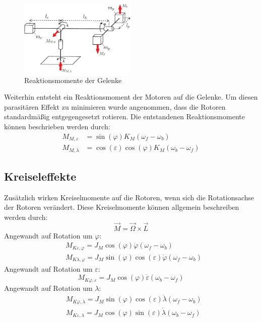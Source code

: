 \documentclass[times, 9pt,twocolumn]{article}
\begin{document}
	\begin{figure}[ht]
	\centering
	\includegraphics[width=0.5\textwidth]{images/setup_mom}
	\caption{Reaktionsmomente der Gelenke}
	\label{setup_mom}
	\end{figure}
	Weiterhin entsteht ein Reaktionsmoment der Motoren auf die Gelenke. Um diesen parasitären Effekt zu minimieren wurde angenommen, dass die Rotoren standardmäßig entgegengesetzt rotieren. Die entstandenen Reaktionsmomente können beschrieben werden durch:
	\begin{align}
	M_{M,\varepsilon} &=\sin (\varphi) K_M (\omega_f-\omega_b) \\
	M_{M,\lambda} &=\cos (\varepsilon) \cos (\varphi) K_M (\omega_b-\omega_f)
	\end{align}

	\subsection{Kreiseleffekte}

	Zusätzlich wirken Kreiselmomente auf die Rotoren, wenn sich die Rotationsachse der Rotoren verändert. Diese Kreiselmomente können allgemein beschreiben werden durch:
	\begin{equation}
	\vec{M} = \vec{\Omega} \times \vec{L}
	\end{equation}	
	Angewandt auf Rotation um $\varphi$:
	\begin{align}
	&M_{K\varepsilon,\varphi} = J_M \cos (\varphi) \dot{\varphi}(\omega_f-\omega_b)\\
	&M_{K\lambda,\varphi} = J_M \sin (\varphi) \cos (\varepsilon) \dot{\varphi}(\omega_f-\omega_b)
	\end{align}
	Angewandt auf Rotation um $\varepsilon$:
	\begin{equation}
	M_{K\varphi,\varepsilon} = J_M \cos (\varphi) \dot{\varepsilon}(\omega_b-\omega_f)
	\end{equation}
	Angewandt auf Rotation um $\lambda$:
	\begin{align}
	&M_{K\varphi,\lambda} = J_M \sin (\varphi) \cos (\varepsilon) \dot{\lambda}(\omega_f-\omega_b)\\
	&M_{K\varepsilon,\lambda} = J_M \cos (\varphi) \sin (\varepsilon) \dot{\lambda}(\omega_b-\omega_f)
	\end{align}
\end{document}
